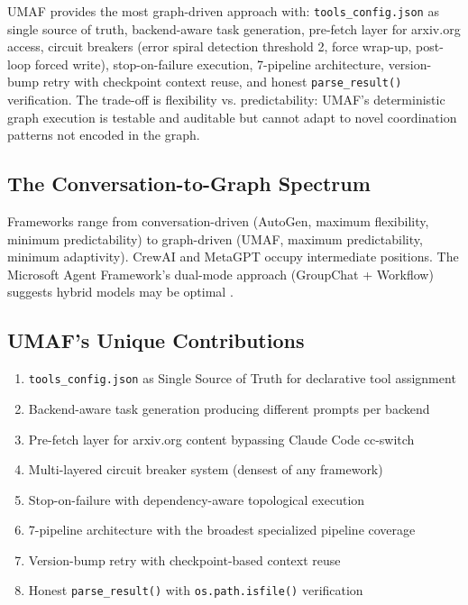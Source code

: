 UMAF provides the most graph-driven approach with: \texttt{tools\_config.json} as single source of truth, backend-aware task generation, pre-fetch layer for arxiv.org access, circuit breakers (error spiral detection threshold 2, force wrap-up, post-loop forced write), stop-on-failure execution, 7-pipeline architecture, version-bump retry with checkpoint context reuse, and honest \texttt{parse\_result()} verification. The trade-off is flexibility vs. predictability: UMAF's deterministic graph execution is testable and auditable but cannot adapt to novel coordination patterns not encoded in the graph.

\subsection{The Conversation-to-Graph Spectrum}

Frameworks range from conversation-driven (AutoGen, maximum flexibility, minimum predictability) to graph-driven (UMAF, maximum predictability, minimum adaptivity). CrewAI and MetaGPT occupy intermediate positions. The Microsoft Agent Framework's dual-mode approach \cite{diagrid} (GroupChat + Workflow) suggests hybrid models may be optimal \cite{agenticfws,adema}.

\subsection{UMAF's Unique Contributions}

\begin{enumerate}
    \item \texttt{tools\_config.json} as Single Source of Truth for declarative tool assignment
    \item Backend-aware task generation producing different prompts per backend
    \item Pre-fetch layer for arxiv.org content bypassing Claude Code cc-switch
    \item Multi-layered circuit breaker system (densest of any framework)
    \item Stop-on-failure with dependency-aware topological execution
    \item 7-pipeline architecture with the broadest specialized pipeline coverage
    \item Version-bump retry with checkpoint-based context reuse
    \item Honest \texttt{parse\_result()} with \texttt{os.path.isfile()} verification
\end{enumerate}

